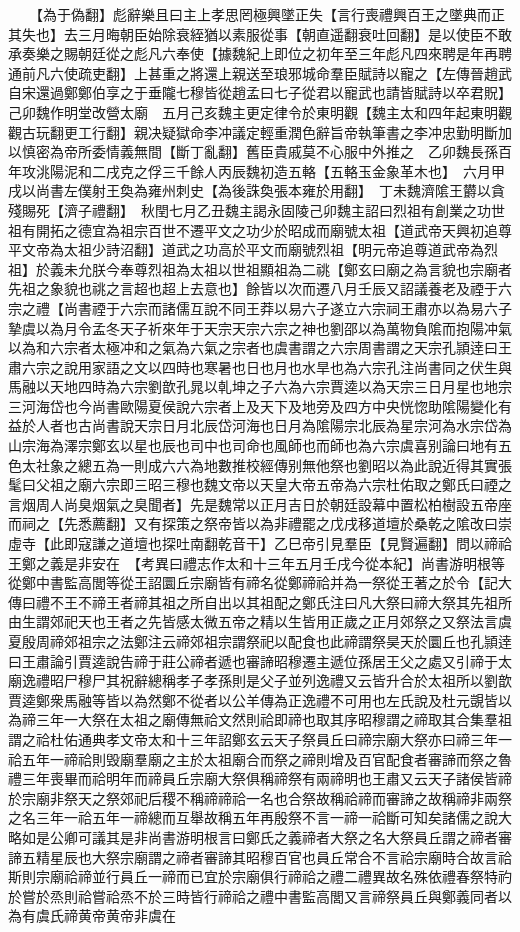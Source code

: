 　　【為于偽翻】彪辭樂且曰主上孝思罔極興墜正失【言行喪禮興百王之墜典而正其失也】去三月晦朝臣始除衰絰猶以素服從事【朝直遥翻衰吐回翻】是以使臣不敢承奏樂之賜朝廷從之彪凡六奉使【據魏紀上即位之初年至三年彪凡四來聘是年再聘通前凡六使疏吏翻】上甚重之將還上親送至琅邪城命羣臣賦詩以寵之【左傳晉趙武自宋還過鄭鄭伯享之于垂隴七穆皆從趙孟曰七子從君以寵武也請皆賦詩以卒君貺】　己卯魏作明堂改營太廟　五月己亥魏主更定律令於東明觀【魏主太和四年起東明觀觀古玩翻更工行翻】親决疑獄命李冲議定輕重潤色辭旨帝執筆書之李冲忠勤明斷加以慎密為帝所委情義無間【斷丁亂翻】舊臣貴戚莫不心服中外推之　乙卯魏長孫百年攻洮陽泥和二戌克之俘三千餘人丙辰魏初造五輅【五輅玉金象革木也】　六月甲戌以尚書左僕射王奐為雍州刺史【為後誅奐張本雍於用翻】　丁未魏濟隂王欝以貪殘賜死【濟子禮翻】　秋閏七月乙丑魏主謁永固陵己卯魏主詔曰烈祖有創業之功世祖有開拓之德宜為祖宗百世不遷平文之功少於昭成而廟號太祖【道武帝天興初追尊平文帝為太祖少詩沼翻】道武之功高於平文而廟號烈祖【明元帝追尊道武帝為烈祖】於義未允朕今奉尊烈祖為太祖以世祖顯祖為二祧【鄭玄曰廟之為言貌也宗廟者先祖之象貌也祧之言超也超上去意也】餘皆以次而遷八月壬辰又詔議養老及禋于六宗之禮【尚書禋于六宗而諸儒互說不同王莽以易六子遂立六宗祠王肅亦以為易六子摯虞以為月令孟冬天子祈來年于天宗天宗六宗之神也劉邵以為萬物負隂而抱陽冲氣以為和六宗者太極冲和之氣為六氣之宗者也虞書謂之六宗周書謂之天宗孔頴逹曰王肅六宗之說用家語之文以四時也寒暑也日也月也水旱也為六宗孔注尚書同之伏生與馬融以天地四時為六宗劉歆孔晁以乹坤之子六為六宗賈逵以為天宗三日月星也地宗三河海岱也今尚書歐陽夏侯說六宗者上及天下及地旁及四方中央恍惚助隂陽變化有益於人者也古尚書說天宗日月北辰岱河海也日月為隂陽宗北辰為星宗河為水宗岱為山宗海為澤宗鄭玄以星也辰也司中也司命也風師也而師也為六宗虞喜别論曰地有五色太社象之總五為一則成六六為地數推校經傳别無他祭也劉昭以為此說近得其實張髦曰父祖之廟六宗即三昭三穆也魏文帝以天皇大帝五帝為六宗杜佑取之鄭氏曰禋之言烟周人尚臭烟氣之臭聞者】先是魏常以正月吉日於朝廷設幕中置松柏樹設五帝座而祠之【先悉薦翻】又有探策之祭帝皆以為非禮罷之戊戌移道壇於桑乾之隂改曰崇虛寺【此即寇謙之道壇也探吐南翻乾音干】乙巳帝引見羣臣【見賢遍翻】問以禘祫王鄭之義是非安在　【考異曰禮志作太和十三年五月壬戌今從本紀】尚書游明根等從鄭中書監高閭等從王詔圜丘宗廟皆有禘名從鄭禘祫并為一祭從王著之於令【記大傳曰禮不王不禘王者禘其祖之所自出以其祖配之鄭氏注曰凡大祭曰禘大祭其先祖所由生謂郊祀天也王者之先皆感太微五帝之精以生皆用正歲之正月郊祭之又祭法言虞夏殷周禘郊祖宗之法鄭注云禘郊祖宗謂祭祀以配食也此禘謂祭昊天於圜丘也孔頴逹曰王肅論引賈逵說告禘于莊公禘者遞也審諦昭穆遷主遞位孫居王父之處又引禘于太廟逸禮昭尸穆尸其祝辭總稱孝子孝孫則是父子並列逸禮又云皆升合於太祖所以劉歆賈逵鄭衆馬融等皆以為然鄭不從者以公羊傳為正逸禮不可用也左氏說及杜元覬皆以為禘三年一大祭在太祖之廟傳無祫文然則祫即禘也取其序昭穆謂之禘取其合集羣祖謂之祫杜佑通典孝文帝太和十三年詔鄭玄云天子祭員丘曰禘宗廟大祭亦曰禘三年一祫五年一禘祫則毁廟羣廟之主於太祖廟合而祭之禘則增及百官配食者審諦而祭之魯禮三年喪畢而祫明年而禘員丘宗廟大祭俱稱禘祭有兩禘明也王肅又云天子諸侯皆禘於宗廟非祭天之祭郊祀后稷不稱禘禘祫一名也合祭故稱祫禘而審諦之故稱禘非兩祭之名三年一祫五年一禘總而互舉故稱五年再殷祭不言一禘一祫斷可知矣諸儒之說大略如是公卿可議其是非尚書游明根言曰鄭氏之義禘者大祭之名大祭員丘謂之禘者審諦五精星辰也大祭宗廟謂之禘者審諦其昭穆百官也員丘常合不言祫宗廟時合故言祫斯則宗廟祫禘並行員丘一禘而已宜於宗廟俱行禘祫之禮二禮異故名殊依禮春祭特礿於嘗於烝則祫嘗祫烝不於三時皆行禘祫之禮中書監高閭又言禘祭員丘與鄭義同者以為有虞氏禘黄帝黄帝非虞在